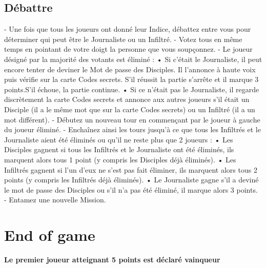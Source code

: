 \documentclass{article}%
\begin{document}
%
\subsection{ Débattre
}%
\label{subsec:Dbattre}%
{-} Une fois que tous les joueurs ont donné leur Indice, débattez entre vous pour déterminer qui peut être le Journaliste ou un Infiltré.
%
{-} Votez tous en même temps en pointant de votre doigt la personne que vous soupçonnez.
%
{-} Le joueur désigné par la majorité des votants est éliminé :
%
• Si c’était le Journaliste, il peut encore tenter de deviner le Mot de passe des Disciples. Il l'annonce à haute voix puis vérifie sur la carte Codes secrets. S’il réussit la partie s’arrête et il marque 3 points.S’il échoue, la partie continue.
%
• Si ce n’était pas le Journaliste, il regarde discrètement la carte Codes secrets et annonce aux autres joueurs s’il était un Disciple (il a le même mot que sur la carte Codes secrets) ou un Infiltré (il a un mot différent).
%
{-} Débutez un nouveau tour en commençant par le joueur à gauche du joueur éliminé.
%
{-} Enchaînez ainsi les tours jusqu’à ce que tous les Infiltrés et le Journaliste aient été éliminés ou qu’il ne reste plus que 2 joueurs :
%
• Les Disciples gagnent si tous les Infiltrés et le Journaliste ont été éliminés, ils marquent alors tous 1 point (y compris
%
les Disciples déjà éliminés).
%
• Les Infiltrés gagnent si l'un d'eux ne s'est pas fait éliminer, ils marquent alors tous 2 points (y compris les Infiltrés déjà éliminés).
%
• Le Journaliste gagne s'il a deviné le mot de passe des Disciples ou s'il n'a pas été éliminé, il marque alors 3 points.
%
{-} Entamez une nouvelle Mission.


%
\section{ End of game
}%
\label{sec:Endofgame}%
\textbf{Le premier joueur atteignant 5 points est déclaré vainqueur}

%
\end{document}
